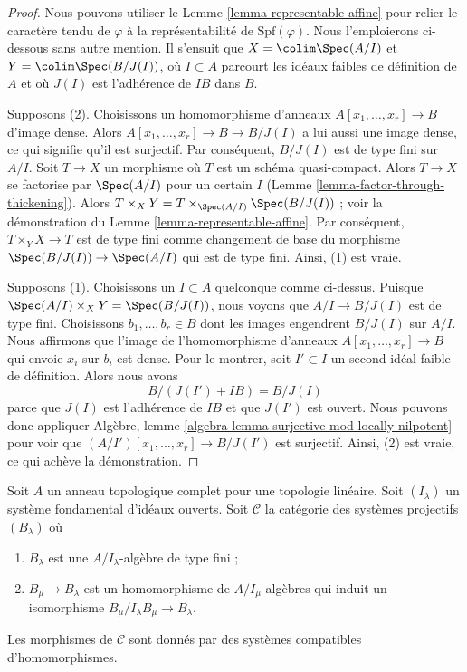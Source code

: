 \begin{proof}
Nous pouvons utiliser le Lemme \ref{lemma-representable-affine} pour relier le caractère tendu de
$\varphi$ à la représentabilité de $\text{Spf}(\varphi)$. Nous l'emploierons
ci-dessous sans autre mention. Il s'ensuit que $X = \colim \Spec(A/I)$
et $Y = \colim \Spec(B/J(I))$, où $I \subset A$ parcourt les idéaux faibles
de définition de $A$ et où $J(I)$ est l'adhérence de $IB$ dans $B$.

\medskip\noindent
Supposons (2).
Choisissons un homomorphisme d'anneaux $A[x_1, \ldots, x_r] \to B$ d'image dense.
Alors $A[x_1, \ldots, x_r] \to B \to B/J(I)$ a lui aussi une image dense,
ce qui signifie qu'il est surjectif. Par conséquent, $B/J(I)$ est de
type fini sur $A/I$. Soit $T \to X$ un morphisme où
$T$ est un schéma quasi-compact. Alors $T \to X$ se factorise par
$\Spec(A/I)$ pour un certain $I$ (Lemme \ref{lemma-factor-through-thickening}).
Alors $T \times_X Y = T \times_{\Spec(A/I)} \Spec(B/J(I))$ ; voir la démonstration du
Lemme \ref{lemma-representable-affine}.
Par conséquent, $T \times_Y X \to T$ est de type fini comme changement de base du
morphisme $\Spec(B/J(I)) \to \Spec(A/I)$ qui est de type
fini. Ainsi, (1) est vraie.

\medskip\noindent
Supposons (1). Choisissons un $I \subset A$ quelconque comme ci-dessus. Puisque
$\Spec(A/I) \times_X Y = \Spec(B/J(I))$, nous voyons que $A/I \to B/J(I)$
est de type fini. Choisissons $b_1, \ldots, b_r \in B$
dont les images engendrent $B/J(I)$ sur $A/I$. Nous affirmons que l'image
de l'homomorphisme d'anneaux $A[x_1, \ldots, x_r] \to B$ qui envoie $x_i$ sur $b_i$
est dense. Pour le montrer, soit $I' \subset I$ un second idéal faible
de définition. Alors nous avons
$$
B/(J(I') + IB) = B/J(I)
$$
parce que $J(I)$ est l'adhérence de $IB$ et que $J(I')$ est ouvert.
Nous pouvons donc appliquer Algèbre, lemme
\ref{algebra-lemma-surjective-mod-locally-nilpotent}
pour voir que $(A/I')[x_1, \ldots, x_r] \to B/J(I')$ est surjectif.
Ainsi, (2) est vraie, ce qui achève la démonstration.
\end{proof}

\noindent
Soit $A$ un anneau topologique complet pour une topologie
linéaire. Soit $(I_\lambda)$ un système fondamental d'idéaux ouverts.
Soit $\mathcal{C}$ la catégorie des systèmes projectifs $(B_\lambda)$ où
\begin{enumerate}
\item $B_\lambda$ est une $A/I_\lambda$-algèbre de type fini ;
\item $B_\mu \to B_\lambda$ est un homomorphisme de $A/I_\mu$-algèbres
qui induit un isomorphisme $B_\mu/I_\lambda B_\mu \to B_\lambda$.
\end{enumerate}
Les morphismes de $\mathcal{C}$ sont donnés par des systèmes compatibles d'homomorphismes.

